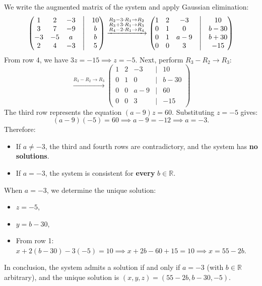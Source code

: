 \begin{exercisesolution*}
\label{sol:two_parameter_linear_system}
We write the augmented matrix of the system and apply Gaussian elimination:
\[
\begin{pmatrix}
1 & 2 & -3 & \big| & 10 \\
3 & 7 & -9 & \big| & b \\
-3 & -5 & a & \big| & b \\
2 & 4 & -3 & \big| & 5
\end{pmatrix}
\xrightarrow{\begin{subarray}{l} R_2 - 3 \cdot R_1 \to R_2 \\R_3 + 3 \cdot R_1 \to R_3 \\ R_4 - 2 \cdot R_1 \to R_4 \end{subarray}}
\begin{pmatrix}
1 & 2 & -3 & \big| & 10 \\
0 & 1 & 0 & \big| & b - 30 \\
0 & 1 & a - 9 & \big| & b + 30 \\
0 & 0 & 3 & \big| & -15
\end{pmatrix}
\]
From row 4, we have $3z = -15 \implies z = -5$.
Next, perform $R_3 - R_2 \to R_3$:
\[
\xrightarrow{R_3 - R_2 \to R_3}
\begin{pmatrix}
1 & 2 & -3 & \big| & 10 \\
0 & 1 & 0 & \big| & b - 30 \\
0 & 0 & a - 9 & \big| & 60 \\
0 & 0 & 3 & \big| & -15
\end{pmatrix}
\]
The third row represents the equation $(a - 9)z = 60$. Substituting $z = -5$ gives:
\[
(a - 9)(-5) = 60 \implies a - 9 = -12 \implies a = -3.
\]
Therefore:
\begin{itemize}
    \item If $a \ne -3$, the third and fourth rows are contradictory, and the system has \textbf{no solutions}.
    \item If $a = -3$, the system is consistent for \textbf{every} $b \in \mathbb{R}$.
\end{itemize}
When $a = -3$, we determine the unique solution:
\begin{itemize}
    \item $z = -5$,
    \item $y = b - 30$,
    \item From row 1: $x + 2(b - 30) - 3(-5) = 10 \implies x + 2b - 60 + 15 = 10 \implies x = 55 - 2b$.
\end{itemize}
In conclusion, the system admits a solution if and only if $a = -3$ (with $b \in \mathbb{R}$ arbitrary), and the unique solution is $(x, y, z) = (55 - 2b, b - 30, -5)$.
\end{exercisesolution*}

